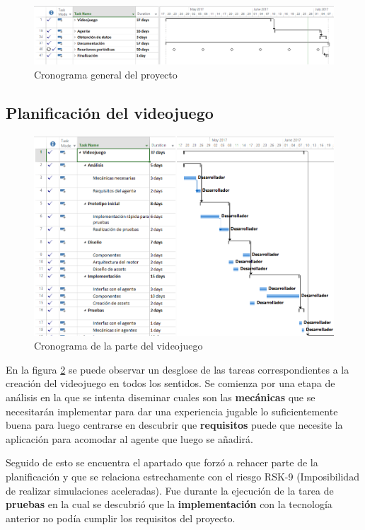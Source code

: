 \begin{figure}
	\centerline{\includegraphics[width=17cm]{otros/capturasPlanificacion/general.PNG}}
	\caption{Cronograma general del proyecto}
	\label{plan:general}
\end{figure}

\subsection{Planificación del videojuego}

\begin{figure}
	\centerline{\includegraphics[width=17cm]{otros/capturasPlanificacion/videojuego.PNG}}
	\caption{Cronograma de la parte del videojuego}
	\label{plan:videojuego}
\end{figure}

En la figura \ref{plan:videojuego} se puede observar un desglose de las tareas correspondientes a la creación del videojuego en todos los sentidos. Se comienza por una etapa de análisis en la que se intenta diseminar cuales son las \textbf{mecánicas} que se necesitarán implementar para dar una experiencia jugable lo suficientemente buena para luego centrarse en descubrir que \textbf{requisitos} puede que necesite la aplicación para acomodar al agente que luego se añadirá.

\bigskip

Seguido de esto se encuentra el apartado que forzó a rehacer parte de la planificación y que se relaciona estrechamente con el riesgo RSK-9 (Imposibilidad de realizar simulaciones aceleradas). Fue durante la ejecución de la tarea de \textbf{pruebas} en la cual se descubrió que la \textbf{implementación} con la tecnología anterior no podía cumplir los requisitos del proyecto.

